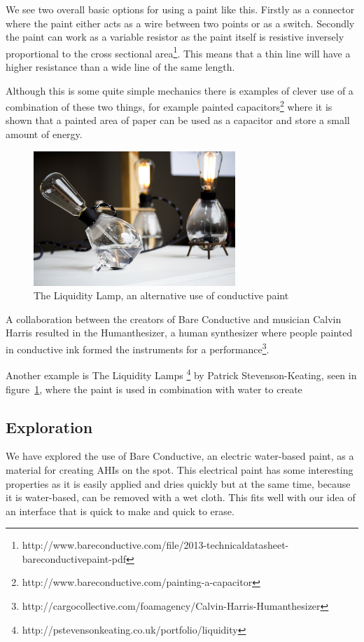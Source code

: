 
We see two overall basic options for using a paint like this.
Firstly as a connector where the paint either acts as a wire between two points or as a switch.
Secondly the paint can work as a variable resistor as the paint itself is resistive inversely proportional to the cross sectional area\footnote{http://www.bareconductive.com/file/2013-technicaldatasheet-bareconductivepaint-pdf}. 
This means that a thin line will have a higher resistance than a wide line of the same length.

Although this is some quite simple mechanics there is examples of clever use of a combination of these two things, for example painted capacitors\footnote{http://www.bareconductive.com/painting-a-capacitor} where it is shown that a painted area of paper can be used as a capacitor and store a small amount of energy.

\begin{figure}[h]
	\centering
  		\includegraphics[width=3in]{figures/proto3/liquidity_lamp}
	\caption{The Liquidity Lamp, an alternative use of conductive paint}
   \label{liquidity_lamp}
\end{figure}

A collaboration between the creators of Bare Conductive and musician Calvin Harris resulted in the Humanthesizer, a human synthesizer where people painted in conductive ink formed the instruments for a performance\footnote{http://cargocollective.com/foamagency/Calvin-Harris-Humanthesizer}.

Another example is The Liquidity Lamps \footnote{http://pstevensonkeating.co.uk/portfolio/liquidity} by Patrick Stevenson-Keating, seen in figure~\ref{liquidity_lamp}, where the paint is used in combination with water to create 


\subsection{Exploration}
We have explored the use of Bare Conductive, an electric water-based paint, as a material for creating AHIs on the spot.
This electrical paint has some interesting properties as it is easily applied and dries quickly but at the same time, because it is water-based, can be removed with a wet cloth.
This fits well with our idea of an interface that is quick to make and quick to erase.

